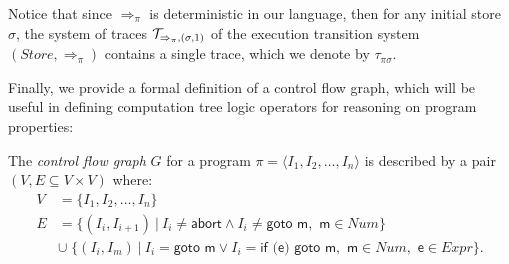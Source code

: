 \noindent Notice that since $\Rightarrow_{\pi}$ is deterministic in our language, then for any initial store $\sigma$, the system of traces ${\cal T}_{\Rightarrow_{\pi},(\sigma,1)}$ of the execution transition system $(Store,\Rightarrow_{\pi})$ contains a single trace, which we denote by $\tau_{\pi\sigma}$.

Finally, we provide a formal definition of a control flow graph, which will be useful in defining computation tree logic operators for reasoning on program properties:

\begin{definition}
\label{de:cfg}
The {\em control flow graph} $G$ for a program $\pi=\langle I_1, I_2, \ldots, I_n \rangle$ is described by a pair $(V, E \subseteq V\times V)$ where:
\begin{align*}
V &= \{ I_1, I_2, \ldots, I_n \} \\
E &= \{(I_i, I_{i+1})\:|\: I_i \neq \textsf{abort} \wedge I_i \neq \textsf{goto m}, \!\textsf{ m}\in Num \} \\
&\cup\;\{(I_i, I_m)\:|\: I_i = \textsf{goto m} \vee I_i = \textsf{if (e) goto m}, \!\textsf{ m}\in Num, \!\textsf{ e}\in Expr \}.
\end{align*}
\end{definition}